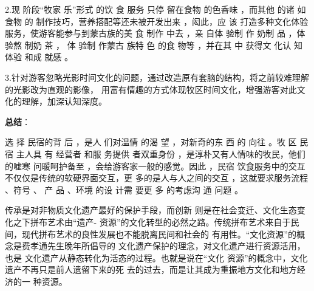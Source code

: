 \documentclass[UTF8]{ctexart}
\begin{document}
2.现 阶段“牧家 乐”形式 的饮 食 服务 只停 留在食物 的色香味 ，而其他 的诸 如食物 的 制作技巧，营养搭配等还未被开发出来 ，闳此，应 该 打造多种文化体验服务，使游客能参与到蒙古族的美 食 制作 中去 ，亲 自体 验制 作 奶制 品 ，体验熬 制奶 茶 ， 体 验制 作蒙古 族特 色 的食 物等 ，并在其 中 获得文 化认 知 体验 和成 就感 。

3.针对游客忽略光影时间文化的问题，通过改造原有套脑的结构，将之前较难理解的光影改为直观的影像， 用富有情趣的方式体现牧区时间文化，增强游客对此文化的理解，加深认知深度。

\textbf{总结}：

选 择 民宿的背 后 ，是人 们对温情 的渴 望 ，对新奇的东 西 的 向往 。牧 区 民宿 主人具 有 经营者 和服 务提供 者双重身份 ，是淳朴又有人情味的牧民，他们的嘘寒 问暖呵护备至 ，会给游客家一般的感觉。因此 ，民宿 饮食服务中的交互不仅仅是传统的软硬界面交互，更 多的是人与人之间的交互 ，这就要求服务流程 、符号 、 产 品 、环境 的设 计需 要更 多 的考虑沟 通 问题 。

传承是对非物质文化遗产最好的保护手段，而创新 则是在社会变迁、文化生态变化之下拼布艺术由“遗产- 资源”的文化转型的必然之路。传统拼布艺术来自于民 间，现代拼布艺术的良性发展也不能脱离民间和社会的 有用性。“文化资源”的概念是费孝通先生晚年所倡导的
文化遗产保护的理念，对文化遗产进行资源活用，也是
文化遗产从静态转化为活态的过程。也就是说在“文化
资源”的概念中，文化遗产不再只是前人遗留下来的死
去的过去，而是让其成为重振地方文化和地方经济的一 种资源\cite{韩冬楠2018基于民宿旅游视角的牧区蒙古包模块化改造设计}\cite{韩冬楠2018文化体验视角下牧区民宿厨房服务系统设计}。


\end{document}
